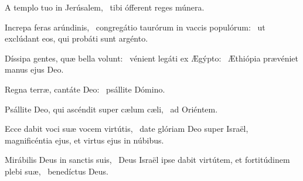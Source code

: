 \item A templo tuo in Jerúsalem,~\psstar{} tibi ófferent reges múnera.

\item Increpa feras arúndinis,~\pscross{} congregátio taurórum in vaccis populórum:~\psstar{} ut exclúdant eos, qui probáti sunt argénto.

\item Díssipa gentes, quæ bella volunt:~\pscross{} vénient legáti ex Ægýpto:~\psstar{} Æthiópia prævéniet manus ejus Deo.

\item Regna terræ, cantáte Deo:~\psstar{} psállite Dómino.

\item Psállite Deo, qui ascéndit super cælum cæli,~\psstar{} ad Oriéntem.

\item Ecce dabit voci suæ vocem virtútis,~\pscross{} date glóriam Deo super Israël,~\psstar{} magnificéntia ejus, et virtus ejus in núbibus.

\item Mirábilis Deus in sanctis suis,~\pscross{} Deus Israël ipse dabit virtútem, et fortitúdinem plebi suæ,~\psstar{} benedíctus Deus.

